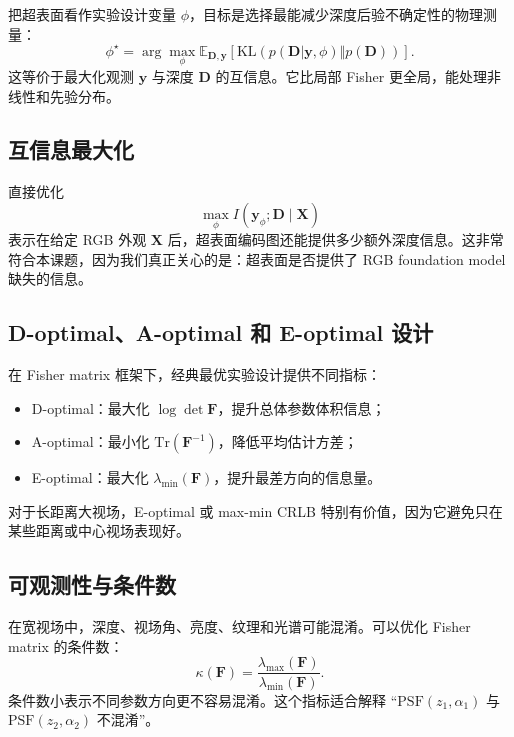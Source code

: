 \documentclass[11pt,a4paper,fontset=none]{ctexart}
\begin{document}
把超表面看作实验设计变量 $\phi$，目标是选择最能减少深度后验不确定性的物理测量：
\begin{equation}
  \phi^\star
  =
  \arg\max_\phi
  \mathbb E_{\bm D,\bm y}
  \left[
  \mathrm{KL}
  \left(
  p(\bm D|\bm y,\phi)
  \Vert
  p(\bm D)
  \right)
  \right].
\end{equation}
这等价于最大化观测 $\bm y$ 与深度 $\bm D$ 的互信息。它比局部 Fisher 更全局，能处理非线性和先验分布。

\subsection{互信息最大化}

直接优化
\begin{equation}
  \max_\phi I(\bm y_\phi;\bm D \mid \bm X)
\end{equation}
表示在给定 RGB 外观 $\bm X$ 后，超表面编码图还能提供多少额外深度信息。这非常符合本课题，因为我们真正关心的是：超表面是否提供了 RGB foundation model 缺失的信息。

\subsection{D-optimal、A-optimal 和 E-optimal 设计}

在 Fisher matrix 框架下，经典最优实验设计提供不同指标：
\begin{itemize}
  \item D-optimal：最大化 $\log\det \bm F$，提升总体参数体积信息；
  \item A-optimal：最小化 $\mathrm{Tr}(\bm F^{-1})$，降低平均估计方差；
  \item E-optimal：最大化 $\lambda_{\min}(\bm F)$，提升最差方向的信息量。
\end{itemize}
对于长距离大视场，E-optimal 或 max-min CRLB 特别有价值，因为它避免只在某些距离或中心视场表现好。

\subsection{可观测性与条件数}

在宽视场中，深度、视场角、亮度、纹理和光谱可能混淆。可以优化 Fisher matrix 的条件数：
\begin{equation}
  \kappa(\bm F)=\frac{\lambda_{\max}(\bm F)}{\lambda_{\min}(\bm F)}.
\end{equation}
条件数小表示不同参数方向更不容易混淆。这个指标适合解释
``$\mathrm{PSF}(z_1,\alpha_1)$ 与 $\mathrm{PSF}(z_2,\alpha_2)$ 不混淆''。
\end{document}
